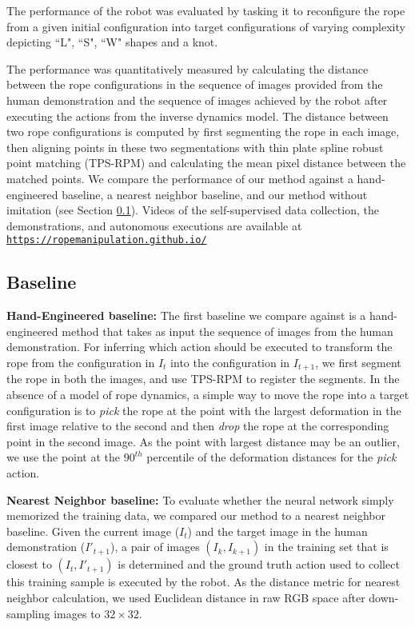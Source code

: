 \documentclass[letterpaper, 10 pt, conference]{ieeeconf}  %
\begin{document}
The performance of the robot was evaluated by tasking it to reconfigure the rope from a given initial configuration into target configurations of varying complexity depicting ``L", ``S", ``W" shapes and a knot. 

The performance was quantitatively measured by calculating the distance between the rope configurations in the sequence of images provided from the human demonstration and the sequence of images achieved by the robot after executing the actions from the inverse dynamics model. The distance between two rope configurations is computed by first segmenting the rope in each image, then aligning points in these two segmentations with thin plate spline robust point matching (TPS-RPM) \cite{chui2000tpsrpm} and calculating the mean pixel distance between the matched points. We compare the performance of our method against a hand-engineered baseline, a nearest neighbor baseline, and our method without imitation (see Section \ref{sec:baseline}). Videos of the self-supervised data collection, the demonstrations, and autonomous executions are available at \href{https://ropemanipulation.github.io/}{\texttt{https://ropemanipulation.github.io/}}

\subsection{Baseline}
\label{sec:baseline}
\noindent \textbf{Hand-Engineered baseline:} The first baseline we compare against is a hand-engineered method that takes as input the sequence of images from the human demonstration. For inferring which action should be executed to transform the rope from the configuration in $I_t$ into the configuration in $I_{t+1}$, we first segment the rope in both the images, and use TPS-RPM to register the segments. In the absence of a model of rope dynamics, a simple way to move the rope into a target configuration is to \textit{pick} the rope at the point with the largest deformation in the first image relative to the second and then \textit{drop} the rope at the corresponding point in the second image. As the point with largest distance may be an outlier, we use the point at the $90^{th}$ percentile of the deformation distances for the \textit{pick} action.

\noindent \textbf{Nearest Neighbor baseline:} To evaluate whether the neural network simply memorized the training data, we compared our method to a nearest neighbor baseline. Given the current image ($I_t$) and the target image in the human demonstration ($I'_{t+1}$), a pair of images $(I_k, I_{k+1})$ in the training set that is closest to $(I_t, I'_{t+1})$ is determined and the ground truth action used to collect this training sample is executed by the robot. As the distance metric for nearest neighbor calculation, we used Euclidean distance in raw RGB space after down-sampling images to $32\times32$. 
\end{document}
